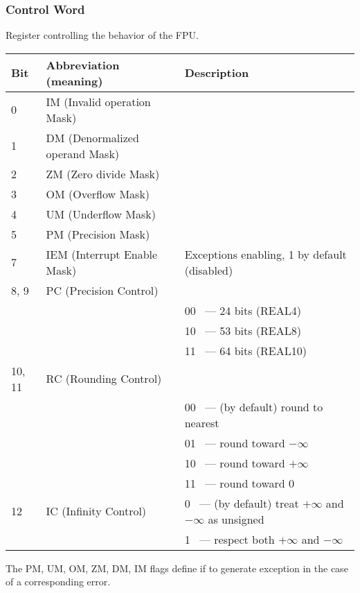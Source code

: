 \label{FPU_control_word}
\subsubsection{Control Word}

Register controlling the behavior of the \ac{FPU}.

\begin{center}
\begin{tabular}{ | l | l | l | }
\hline
Bit &
Abbreviation (meaning) &
Description \\
\hline
0   & IM (Invalid operation Mask) & \\
\hline
1   & DM (Denormalized operand Mask) & \\
\hline
2   & ZM (Zero divide Mask) & \\
\hline
3   & OM (Overflow Mask) & \\
\hline
4   & UM (Underflow Mask) & \\
\hline
5   & PM (Precision Mask) & \\
\hline
7   & IEM (Interrupt Enable Mask) & Exceptions enabling, 1 by default (disabled) \\
\hline
8, 9 & PC (Precision Control) &  \\
     &                        & 00 ~--- 24 bits (REAL4) \\
     &                        & 10 ~--- 53 bits (REAL8) \\
     &                        & 11 ~--- 64 bits (REAL10) \\
\hline
10, 11 & RC (Rounding Control) &  \\
       &                       & 00 ~--- (by default) round to nearest \\
       &                       & 01 ~--- round toward $-\infty$ \\
       &                       & 10 ~--- round toward $+\infty$ \\
       &                       & 11 ~--- round toward 0 \\
\hline
12 & IC (Infinity Control) & 0 ~--- (by default) treat $+\infty$ and $-\infty$ as unsigned \\
   &                       & 1 ~--- respect both $+\infty$ and $-\infty$ \\
\hline
\end{tabular}
\end{center}

The PM, UM, OM, ZM, DM, IM 
flags define if to generate exception in the case of a corresponding error.

